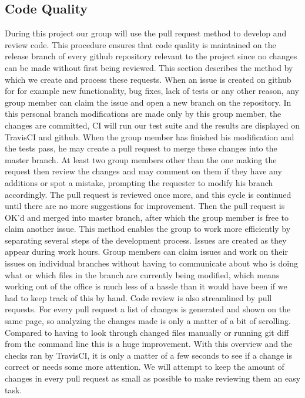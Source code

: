 \documentclass[]{article}
\begin{document}
\subsection{Code Quality}
During this project our group will use the pull request method to develop and review code. This procedure ensures that code quality is maintained on the release branch of every github repository relevant to the project since no changes can be made without first being reviewed. This section describes the method by which we create and process these requests.
When an issue is created on github for for example new functionality, bug fixes, lack of tests or any other reason, any group member can claim the issue and open a new branch on the repository. In this personal branch modifications are made only by this group member, the changes are committed, \gls{CI} will run our test suite and the results are displayed on TravisCI and github. When the group member has finished his modification and the tests pass, he may create a pull request to merge these changes into the master branch. At least two group members other than the one making the request then review the changes and may comment on them if they have any additions or spot a mistake, prompting the requester to modify his branch accordingly. The pull request is reviewed once more, and this cycle is continued until there are no more suggestions for improvement. Then the pull request is OK'd and merged into master branch, after which the group member is free to claim another issue. This method enables the group to work more efficiently by separating several steps of the development process. Issues are created as they appear during work hours. Group members can claim issues and work on their issues on individual branches without having to communicate about who is doing what or which files in the branch are currently being modified, which means working out of the office is much less of a hassle than it would have been if we had to keep track of this by hand.
Code review is also streamlined by pull requests. For every pull request a list of changes is generated and shown on the same page, so analyzing the changes made is only a matter of a bit of scrolling. Compared to having to look through changed files manually or running git diff from the command line this is a huge improvement. With this overview and the checks ran by TravisCI, it is only a matter of a few seconds to see if a change is correct or needs some more attention.
We will attempt to keep the amount of changes in every pull request as small as possible to make reviewing them an easy task.
\newpage
\end{document}
